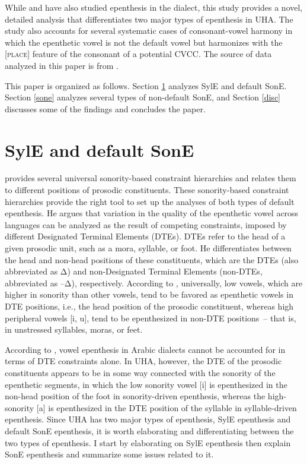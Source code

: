 \documentclass[output=paper,colorlinks,citecolor=brown]{langscibook}
\begin{document}
While \citet{Abu-Mansour1987} and \citet{Kabrah2004} have also studied epenthesis in the dialect, this study provides a novel, detailed analysis that differentiates two major types of epenthesis in UHA. The study also accounts for several systematic cases of consonant-vowel harmony in which the epenthetic vowel is not the default vowel but harmonizes with the [\textsc{place}] feature of the consonant of a potential CVCC. The source of data analyzed in this paper is from \citet{Bokhari2020}.

This paper is organized as follows. Section \ref{both} analyzes SylE and default SonE. Section \ref{sone} analyzes several types of non-default SonE, and Section \ref{disc} discusses some of the findings and concludes the paper.

 \section{SylE and default SonE}\label{both}
 \citet{DeLacy2006} provides several universal sonority-based constraint hierarchies and relates them to different positions of prosodic constituents. These sonority-based constraint hierarchies provide the right tool to set up the analyses of both types of  default epenthesis. He argues that variation in the quality of the epenthetic vowel across languages can be analyzed as the result of competing constraints, imposed by different Designated Terminal Elements (DTEs). DTEs refer to the head of a given prosodic unit, such as a mora, syllable, or foot. He differentiates between the head and non-head positions of these constituents, which are the DTEs (also abbreviated as Δ) and non-Designated Terminal Elements (non-DTEs, abbreviated as –Δ), respectively. According to \citeauthor{DeLacy2006}, universally, low vowels, which are higher in sonority than other vowels, tend to be favored as epenthetic vowels in DTE positions, i.e., the head position of the prosodic constituent, whereas high peripheral vowels [i, u], tend to be epenthesized in non-DTE positions~-- that is, in   unstressed syllables, moras, or feet.


According to \citet[305]{DeLacy2006}, vowel epenthesis in Arabic dialects cannot be accounted for in terms of DTE constraints alone. In UHA, however, the DTE of the prosodic constituents appears to be in some way connected with the sonority of the epenthetic segments, in which the low sonority vowel [i] is epenthesized  in the non-head position of the foot in sonority-driven epenthesis, whereas the high-sonority [a] is epenthesized in the DTE position of the syllable in syllable-driven epenthesis. Since UHA has two major types of epenthesis, SylE epenthesis and default SonE epenthesis, it is worth elaborating and differentiating between the two types of epenthesis. I start by elaborating on SylE epenthesis then explain SonE epenthesis and summarize some issues related to it.
\end{document}
